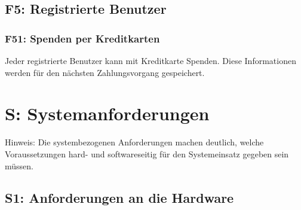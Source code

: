 \documentclass[10pt,a4paper]{scrartcl}
\begin{document}
%

%

%

\subsection{F5: Registrierte Benutzer}

\subsubsection*{F51: Spenden per Kreditkarten}
Jeder registrierte Benutzer kann mit Kreditkarte Spenden. Diese Informationen werden für den nächsten Zahlungsvorgang gespeichert.

\section{S: Systemanforderungen}
Hinweis: Die systembezogenen Anforderungen machen deutlich, welche Voraussetzungen hard- und softwareseitig für den Systemeinsatz gegeben sein müssen.

\subsection{S1: Anforderungen an die Hardware}
\end{document}
